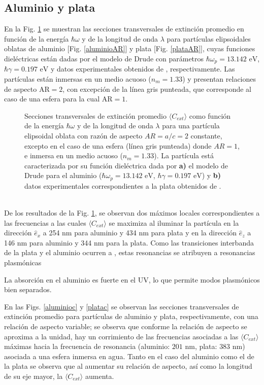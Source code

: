 \subsection*{Aluminio y plata}
En la Fig. \ref{aluminioplataAR} se muestran las secciones transversales de extinción promedio en función de la energía $\hbar\omega$ y de la longitud de onda $\lambda$ para partículas elipsoidales oblatas de aluminio [Fig. \ref{aluminioAR}] y plata [Fig. \ref{plataAR}], cuyas funciones dieléctricas están dadas por el modelo de Drude con parámetros $\hbar\omega_p=13.142\text{ eV}$, $\hbar\gamma=0.197\text{ eV}$ y datos experimentales obtenidos de \cite{Plata}, respectivamente. Las partículas están inmersas en un medio acuoso ($n_m=1.33$) y  presentan relaciones de aspecto AR$=2$, con excepción de la línea gris punteada, que corresponde al caso de una esfera para la cual AR$=1$. 
\begin{figure}[h!]
	\quad%
	\caption{Secciones transversales de extinción promedio $\langle C_{ext}\rangle$ como función de la energía $\hbar\omega$ y de la longitud de onda $\lambda$ para una partícula elipsoidal oblata con razón de aspecto $AR=a/c=2$ constante, excepto en el caso de una esfera (línea gris punteada) donde $AR=1$, e inmersa en un medio acuoso ($n_m=1.33$). La partícula está caracterizada por su función dieléctrica dada por  \textbf{a)} el modelo de Drude para el aluminio ($\hbar\omega_p=13.142\text{ eV}$, $\hbar\gamma=0.197\text{ eV}$) y \textbf{b)} datos experimentales correspondientes a la plata obtenidos de \cite{Plata}. }\label{aluminioplataAR}
\end{figure}\\

\noindent De los resultados de la Fig. \ref{aluminioplataAR}, se observan dos máximos locales correspondientes a las frecuencias a las cuales $\langle C_{ext}\rangle$ se maximiza al iluminar la partícula en la dirección $\hat{e}_x$ a 254 nm para aluminio y 434 nm para plata y en la dirección $\hat{e}_z$
a 146 nm para aluminio y 344 nm para la plata. Como las transiciones interbanda de la plata y el aluminio ocurren a , estas resonancias se atribuyen a resonancias plasmónicas

La absorción en el aluminio es fuerte en el UV, lo que permite modos plasmónicos bien separados.


 En las Figs. \ref{aluminioc}  y \ref{platac} se observan las secciones transversales de extinción promedio para partículas de aluminio y plata, respectivamente, con una relación de aspecto variable; se observa que conforme la relación de aspecto se aproxima a la unidad, hay un corrimiento de las frecuencias asociadas a las $\langle C_{ext}\rangle$ máximas hacia la frecuencia de resonancia (aluminio: $201\text{ nm}$, plata: $383\text{ nm}$) asociada a una esfera  inmersa en agua. Tanto en el caso del aluminio como el de la plata se observa que al aumentar su relación de aspecto, así como la longitud de su eje mayor, la $\langle C_{ext}\rangle$ aumenta.



